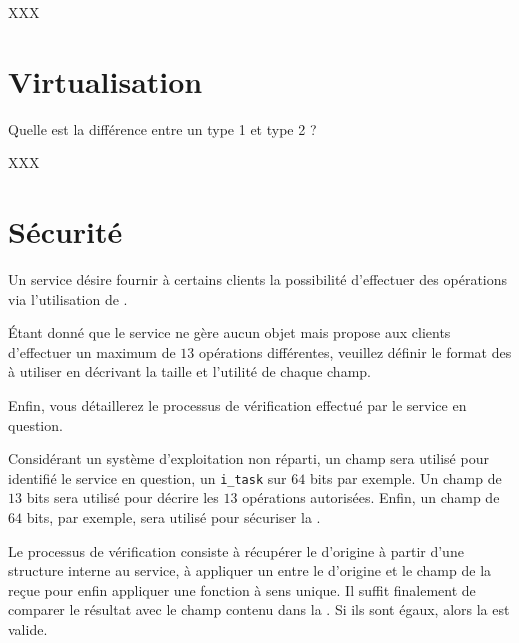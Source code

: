 \begin{correction}

XXX

\end{correction}

%
%

\section{Virtualisation
         }

Quelle est la diff\'erence entre un 
type 1 et type 2 ?

\begin{correction}

XXX

\end{correction}

% 
%

\section{S\'ecurit\'e
         }

Un service d\'esire fournir \`a certains clients la possibilit\'e
d'effectuer des op\'erations via l'utilisation de .

\'Etant donn\'e que le service ne g\`ere aucun objet mais propose
aux clients d'effectuer un maximum de $13$ op\'erations diff\'erentes,
veuillez d\'efinir le format des  \`a utiliser en
d\'ecrivant la taille et l'utilit\'e de chaque champ.

Enfin, vous d\'etaillerez le processus de v\'erification effectu\'e
par le service en question.

\begin{correction}

Consid\'erant un syst\`eme d'exploitation non r\'eparti, un champ sera
utilis\'e pour identifi\'e le service en question, un \texttt{i\_task}
sur $64$ bits par exemple. Un champ de $13$ bits sera utilis\'e pour
d\'ecrire les $13$ op\'erations autoris\'ees. Enfin, un champ 
de $64$ bits, par exemple, sera utilis\'e pour s\'ecuriser la
.

Le processus de v\'erification consiste \`a r\'ecup\'erer le 
d'origine \`a partir d'une structure interne au service, \`a appliquer un
 entre le  d'origine et le champ 
de la  re\c{c}ue pour enfin appliquer une fonction
\`a sens unique. Il suffit finalement de comparer le r\'esultat avec le
champ  contenu dans la . Si ils sont
\'egaux, alors la  est valide.

\end{correction}

